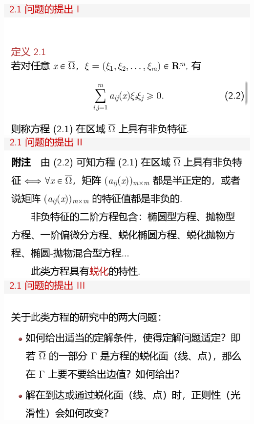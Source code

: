 \documentclass[11pt,a4paper]{ctexart}
\begin{document}
\begin{paracol}{2}
\includegraphics[width=\linewidth]{chap05_18.png}
\includegraphics[width=\linewidth]{chap05_19.png}
\includegraphics[width=\linewidth]{chap05_20.png}
\newpage


\end{paracol}
\end{document}
